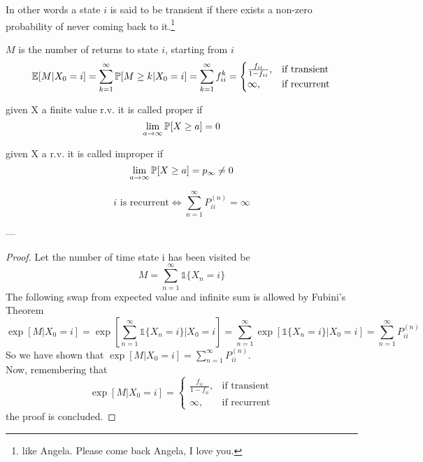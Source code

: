 	In other words a state $i$ is said to be transient if there exists a non-zero probability of never coming back to it.\footnote{like Angela. Please come back Angela, I love you.}

	\begin{definition}
		$M$ is the number of returns to state $i$, starting from $i$
		$$\mathbb{E}[M | X_0 = i] = \sum\limits_{k=1}^\infty \mathbb{P}[M\geq k | X_0 = i] = \sum\limits_{k=1}^\infty f_{ii}^k = \begin{cases}
		\frac{f_{ii}}{1-f_{ii}}, & \text{if transient} \\
		\infty, & \text{if recurrent}
		\end{cases}$$
	\end{definition}

	\begin{definition}[Proper r.v]
		given X a finite value r.v. it is called proper if $$\lim_{a\to \infty} \mathbb{P}[X\geq a] = 0$$
	\end{definition}

	\begin{definition}[Improper r.v]
		given X a r.v. it is called improper if  $$\lim_{a\to \infty} \mathbb{P}[X\geq a] = p_\infty \ne 0$$
	\end{definition}

	\begin{theorem}
		$$i  \text{ is recurrent} \iff \sum\limits_{n=1}^\infty P_{ii}^{(n)} = \infty$$
	\end{theorem}
	---

	\begin{proof}
		Let the number of time state i has been visited be $$M = \sum\limits_{n=1}^\infty \mathds{1}\{X_n =i\} $$
		The following swap from expected value and infinite sum is allowed by Fubini's Theorem
		$$
			\exp[M | X_0 = i] = \exp\left[\sum\limits_{n=1}^\infty \mathds{1}\{X_n = i\} | X_0 = i\right]
			= \sum\limits_{n=1}^\infty \exp\left[\mathds{1}\{ X_n = i\} | X_0 = i\right] = \sum\limits_{n=1}^\infty P_{ii}^{(n)}
		$$
		So we have shown that $\exp[M | X_0=i] = \sum\limits_{n=1}^\infty P_{ii}^{(n)}$.\\
		Now, remembering that $$ \exp[M | X_0 = i] = \begin{cases}
		\frac{f_{ii}}{1-f_{ii}}, & \text{if transient} \\
		\infty, & \text{if recurrent}
		\end{cases}$$
		the proof is concluded.
	\end{proof}

